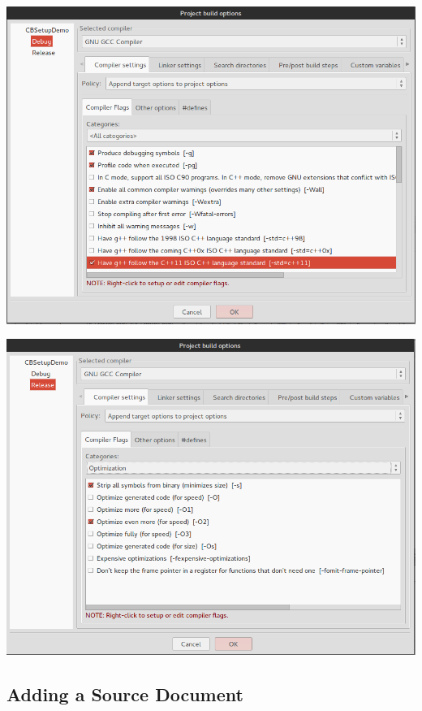 \documentclass[10pt]{article}
\begin{document}
\vspace{.1in}
\begin{center}
\includegraphics[scale=.5]{CB_BasicDebugOpts.png}
\end{center}
\vspace{.1in}

\vspace{.1in}
\begin{center}
\includegraphics[scale=.5]{CB_BasicReleaseOpts.png}
\end{center}
\vspace{.1in}

\subsection{Adding a Source Document}
\end{document}
